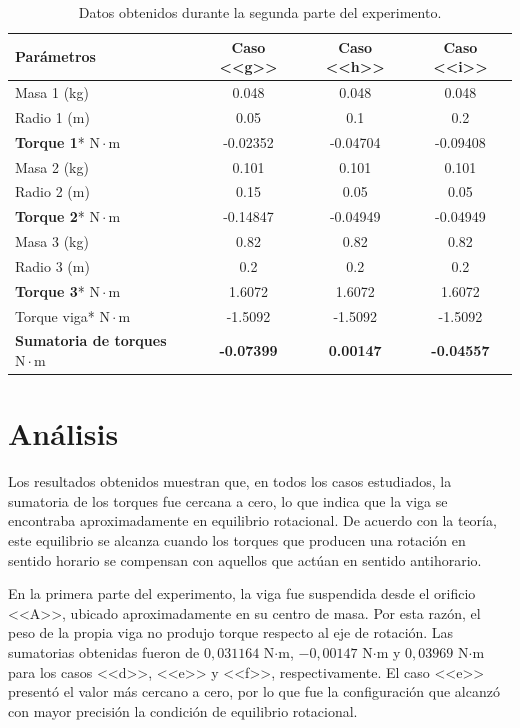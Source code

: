 \begin{table}[H]
\centering
\begin{tabular}{lccc}
\toprule
\textbf{Parámetros} & \textbf{Caso <<g>>} & \textbf{Caso <<h>>} & \textbf{Caso <<i>>} \\
\midrule
Masa 1 (kg) & 0.048 & 0.048 & 0.048 \\
Radio 1 (m) & 0.05 & 0.1 & 0.2 \\
\textbf{Torque 1}* $\mathrm{N\cdot m}$ & -0.02352 & -0.04704 & -0.09408 \\
\midrule
Masa 2 (kg) & 0.101 & 0.101 & 0.101 \\
Radio 2 (m) & 0.15 & 0.05 & 0.05 \\
\textbf{Torque 2}* $\mathrm{N\cdot m}$ & -0.14847 & -0.04949 & -0.04949 \\
\midrule
Masa 3 (kg) & 0.82 & 0.82 & 0.82 \\
Radio 3 (m) & 0.2 & 0.2 & 0.2 \\
\textbf{Torque 3}* $\mathrm{N\cdot m}$ & 1.6072 & 1.6072 & 1.6072 \\
\midrule
Torque viga* $\mathrm{N\cdot m}$ & -1.5092 & -1.5092 & -1.5092 \\
\textbf{Sumatoria de torques} $\mathrm{N\cdot m}$ & \textbf{-0.07399} & \textbf{0.00147} & \textbf{-0.04557} \\
\bottomrule
\end{tabular}
\caption{Datos obtenidos durante la segunda parte del experimento.}

\end{table}

\newpage
\section {Análisis}
Los resultados obtenidos muestran que, en todos los casos estudiados, la sumatoria de los torques fue cercana a cero, lo que indica que la viga se encontraba aproximadamente en equilibrio rotacional. De acuerdo con la teoría, este equilibrio se alcanza cuando los torques que producen una rotación en sentido horario se compensan con aquellos que actúan en sentido antihorario.

En la primera parte del experimento, la viga fue suspendida desde el orificio <<A>>, ubicado aproximadamente en su centro de masa. Por esta razón, el peso de la propia viga no produjo torque respecto al eje de rotación. Las sumatorias obtenidas fueron de $0{,}031164$ N$\cdot$m, $-0{,}00147$ N$\cdot$m y $0{,}03969$ N$\cdot$m para los casos <<d>>, <<e>> y <<f>>, respectivamente. El caso <<e>> presentó el valor más cercano a cero, por lo que fue la configuración que alcanzó con mayor precisión la condición de equilibrio rotacional.

